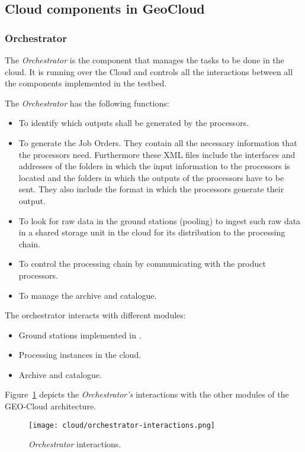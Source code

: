 \subsection{Cloud components in GeoCloud}

\subsubsection{Orchestrator}
\label{sub:orch}
The \emph{Orchestrator} is the
component that manages the tasks to be done in the cloud. It is running over the
\bonfire Cloud and controls all the interactions between all the components
implemented in the \bonfire testbed.

The \emph{Orchestrator} has the following functions:

\begin{itemize}
\item To identify which outputs shall be generated by the processors.
\item To generate the Job Orders. They contain all the necessary information
  that the processors need. Furthermore these \ac{XML} files include the interfaces and addresses of the folders in which the input information to the processors is located and the folders in which the outputs of the processors have to be sent. They also include the format in which the processors generate their output.
\item To look for raw data in the ground stations (pooling) to ingest such raw data in a shared storage unit in the cloud for its distribution to the processing chain.
\item To control the processing chain by communicating with the product processors.
\item To manage the archive and catalogue.
\end{itemize}

The orchestrator interacts with different modules:
\begin{itemize}

\item Ground stations implemented in \vw.
\item Processing instances in the cloud.
\item Archive and catalogue.
\end{itemize}

Figure~\ref{fig:orchestrator-interactions} depicts the \emph{Orchestrator’s} interactions with the other modules of the GEO-Cloud architecture.


\begin{figure}[!h]
\begin{center}
\texttt{[image: cloud/orchestrator-interactions.png]}
\caption{\emph{Orchestrator} interactions.}
\label{fig:orchestrator-interactions}
\end{center}
\end{figure}


